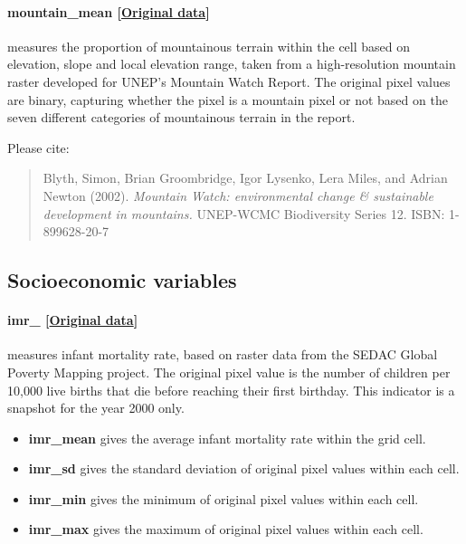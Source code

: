 \documentclass[]{book}
\begin{document}
\paragraph{mountain\_mean
{[}\href{http://www.unep-wcmc.org/resources-and-data/mountains-and-forests-in-mountains}{Original
data}{]}}\label{mountain-mean}

measures the proportion of mountainous terrain within the cell based on
elevation, slope and local elevation range, taken from a high-resolution
mountain raster developed for UNEP's Mountain Watch Report. The original
pixel values are binary, capturing whether the pixel is a mountain pixel
or not based on the seven different categories of mountainous terrain in
the report.

Please cite:

\begin{quote}
Blyth, Simon, Brian Groombridge, Igor Lysenko, Lera Miles, and Adrian
Newton (2002). \emph{Mountain Watch: environmental change \& sustainable
development in mountains.} UNEP-WCMC Biodiversity Series 12. ISBN:
1-899628-20-7
\end{quote}

\subsection{Socioeconomic variables}\label{socioeconomic-variables}

\paragraph{imr\_
{[}\href{http://sedac.ciesin.columbia.edu/data/set/povmap-global-subnational-infant-mortality-rates}{Original
data}{]}}\label{imr-}

measures infant mortality rate, based on raster data from the SEDAC
Global Poverty Mapping project. The original pixel value is the number
of children per 10,000 live births that die before reaching their first
birthday. This indicator is a snapshot for the year 2000 only.

\begin{itemize}
\itemsep1pt\parskip0pt
\item
  \textbf{imr\_mean} gives the average infant mortality rate within the
  grid cell.
\item
  \textbf{imr\_sd} gives the standard deviation of original pixel values
  within each cell.
\item
  \textbf{imr\_min} gives the minimum of original pixel values within
  each cell.
\item
  \textbf{imr\_max} gives the maximum of original pixel values within
  each cell.
\end{itemize}
\end{document}
